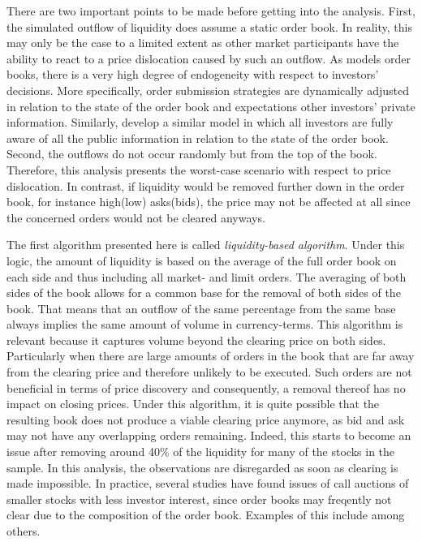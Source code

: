 \documentclass[11pt,a4paper]{article}
\begin{document}

    There are two important points to be made before getting into the analysis. First, the simulated outflow of liquidity does assume a static order book. In reality, this may only be the case to a limited extent as other market participants have the ability to react to a price dislocation caused by such an outflow. As \textcite{Parlour1998} models order books, there is a very high degree of endogeneity with respect to investors' decisions. More specifically, order submission strategies are dynamically adjusted in relation to the state of the order book and expectations other investors' private information. Similarly, \textcite{PascualVeredas2009} develop a similar model in which all investors are fully aware of all the public information in relation to the state of the order book. Second, the outflows do not occur randomly but from the top of the book. Therefore, this analysis presents the worst-case scenario with respect to price dislocation. In contrast, if liquidity would be removed further down in the order book, for instance high(low) asks(bids), the price may not be affected at all since the concerned orders would not be cleared anyways.

    The first algorithm presented here is called \textit{liquidity-based algorithm}. Under this logic, the amount of liquidity is based on the average of the full order book on each side and thus including all market- and limit orders. The averaging of both sides of the book allows for a common base for the removal of both sides of the book. That means that an outflow of the same percentage from the same base always implies the same amount of volume in currency-terms. This algorithm is relevant because it captures volume beyond the clearing price on both sides. Particularly when there are large amounts of orders in the book that are far away from the clearing price and therefore unlikely to be executed. Such orders are not beneficial in terms of price discovery and consequently, a removal thereof has no impact on closing prices. Under this algorithm, it is quite possible that the resulting book does not produce a viable clearing price anymore, as bid and ask may not have any overlapping orders remaining. Indeed, this starts to become an issue after removing around 40\% of the liquidity for many of the stocks in the sample. In this analysis, the observations are disregarded as soon as clearing is made impossible. In practice, several studies have found issues of call auctions of smaller stocks with less investor interest, since order books may freqently not clear due to the composition of the order book. Examples of this include \textcite{EllulShinTonks2005,Ibikunle2015} among others.
\end{document}
